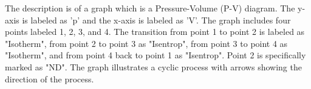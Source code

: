 The description is of a graph which is a Pressure-Volume (P-V) diagram. The y-axis is labeled as 'p' and the x-axis is labeled as 'V'. The graph includes four points labeled 1, 2, 3, and 4. The transition from point 1 to point 2 is labeled as "Isotherm", from point 2 to point 3 as "Isentrop", from point 3 to point 4 as "Isotherm", and from point 4 back to point 1 as "Isentrop". Point 2 is specifically marked as "ND". The graph illustrates a cyclic process with arrows showing the direction of the process.